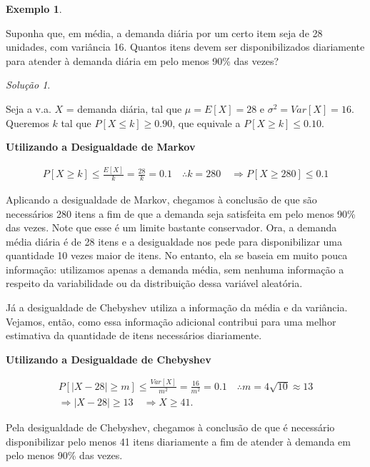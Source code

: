 \documentclass[
]{book}
\theoremstyle{definition}
\theoremstyle{definition}
\newtheorem{example}{Exemplo}[chapter]
\theoremstyle{definition}
\theoremstyle{remark}
\newtheorem*{solution}{Solução}
\begin{document}
\begin{example}
\protect\hypertarget{exm:unnamed-chunk-20}{}{\label{exm:unnamed-chunk-20} }
\end{example}

Suponha que, em média, a demanda diária por um certo item seja de 28 unidades, com variância 16. Quantos itens devem ser disponibilizados diariamente para atender à demanda diária em pelo menos 90\% das vezes?

\begin{solution}
{}
\end{solution}

Seja a v.a. \(X\) = demanda diária, tal que \({\mu = E[X] = 28}\) e \({\sigma^2 = Var[X] = 16}\). Queremos \(k\) tal que \({P[X \leq k] \geq 0.90}\), que equivale a \({P[X \geq k] \leq 0.10}\).

\textbf{Utilizando a Desigualdade de Markov}

\begin{align*}
{P[X \geq k] \leq \frac{E[X]}{k} = \frac{28}{k} = 0.1 \quad \therefore k = 280 \quad \Rightarrow P[X \geq 280] \leq 0.1}
\end{align*}

Aplicando a desigualdade de Markov, chegamos à conclusão de que são necessários 280 itens a fim de que a demanda seja satisfeita em pelo menos 90\% das vezes. Note que esse é um limite bastante conservador. Ora, a demanda média diária é de 28 itens e a desigualdade nos pede para disponibilizar uma quantidade 10 vezes maior de itens. No entanto, ela se baseia em muito pouca informação: utilizamos apenas a demanda média, sem nenhuma informação a respeito da variabilidade ou da distribuição dessa variável aleatória.

Já a desigualdade de Chebyshev utiliza a informação da média e da variância. Vejamos, então, como essa informação adicional contribui para uma melhor estimativa da quantidade de itens necessários diariamente.

\textbf{Utilizando a Desigualdade de Chebyshev}

\begin{align*}
{P[|X -28|\geq m] \leq \frac{Var[X]}{m^2} = \frac{16}{m^2} = 0.1 \quad \therefore m = 4\sqrt{10} \approx 13}\\
{\Rightarrow |X -28| \geq 13 \quad \Rightarrow X \geq 41}.
\end{align*}

Pela desigualdade de Chebyshev, chegamos à conclusão de que é necessário disponibilizar pelo menos 41 itens diariamente a fim de atender à demanda em pelo menos 90\% das vezes.
\end{document}

